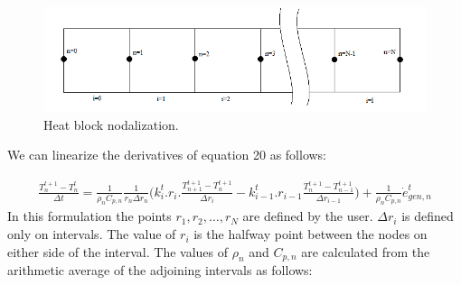 \documentclass[11pt,letterpaper,titlepage]{article}
\begin{document}
	\begin{center}
		\begin{minipage}[c]{0.85\textwidth}
	
			\begin{figure}[H]
			
				\includegraphics[width=6in]{ZZZ_HeatBlock.png}
				\caption{Heat block nodalization.}
				\label{figure:ZZZ_HeatBlock}
			\end{figure}
		\end{minipage}
	\end{center}
\vspace{0.5cm}
\noindent

We can linearize the derivatives of equation 20 as follows:

\begin{equation}
\begin{aligned}
\frac{T_n^{t+1}-T_n^t}{\Delta t} = \frac{1}{\rho_n C_{p,n}} \frac{1}{r_n\Delta r_n} \biggr(  k_i^t.r_i. \frac{T_{n+1}^{t+1} - T_{n}^{t+1}}{\Delta r_i}  - k_{i-1}^t.r_{i-1} \frac{T_{n}^{t+1} - T_{n-1}^{t+1}}{\Delta r_{i-1}} \biggr) + \frac{1}{\rho_n C_{p,n}} \dot{e}_{gen,n}^t
\end{aligned}
\end{equation}
\newline
In this formulation the points $r_1,r_2,\dots,r_N$ are defined by the user. $\Delta r_i$ is defined only on intervals. The value of $r_i$ is the halfway point between the nodes on either side of the interval. The values of $\rho_n$ and $C_{p,n}$ are calculated from the arithmetic average of the adjoining intervals as follows:
\end{document}
